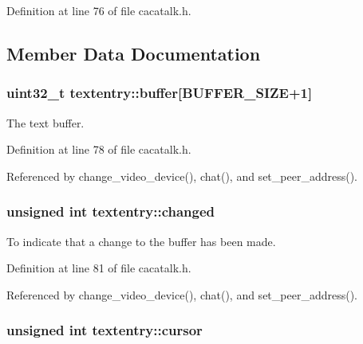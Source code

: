 \-Definition at line 76 of file cacatalk.\-h.



\subsection{\-Member \-Data \-Documentation}
\hypertarget{structtextentry_aa504334ee4b52796c93d25e10784d29e}{
\subsubsection[{buffer}]{\setlength{\rightskip}{0pt plus 5cm}uint32\-\_\-t {\bf textentry\-::buffer}\mbox{[}{\bf \-B\-U\-F\-F\-E\-R\-\_\-\-S\-I\-Z\-E}+1\mbox{]}}}\label{structtextentry_aa504334ee4b52796c93d25e10784d29e}


\-The text buffer. 



\-Definition at line 78 of file cacatalk.\-h.



\-Referenced by change\-\_\-video\-\_\-device(), chat(), and set\-\_\-peer\-\_\-address().

\hypertarget{structtextentry_a5af018f6c56b4ae3f60674c70226cec7}{
\subsubsection[{changed}]{\setlength{\rightskip}{0pt plus 5cm}unsigned int {\bf textentry\-::changed}}}\label{structtextentry_a5af018f6c56b4ae3f60674c70226cec7}


\-To indicate that a change to the buffer has been made. 



\-Definition at line 81 of file cacatalk.\-h.



\-Referenced by change\-\_\-video\-\_\-device(), chat(), and set\-\_\-peer\-\_\-address().

\hypertarget{structtextentry_a61cdc6b8c0bede44adf1f61fa347e7bc}{
\subsubsection[{cursor}]{\setlength{\rightskip}{0pt plus 5cm}unsigned int {\bf textentry\-::cursor}}}\label{structtextentry_a61cdc6b8c0bede44adf1f61fa347e7bc}


